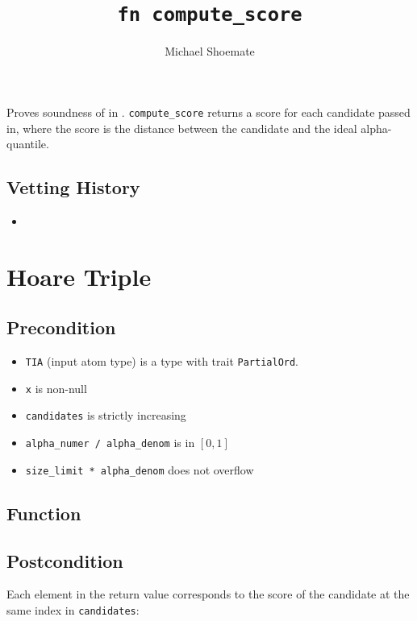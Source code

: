 \documentclass{article}
\title{\texttt{fn compute\_score}}
\author{Michael Shoemate}
\begin{document}
\maketitle  


\contrib

Proves soundness of  
in .
\texttt{compute\_score} returns a score for each candidate passed in, 
where the score is the distance between the candidate and the ideal alpha-quantile.

\subsection*{Vetting History}
\begin{itemize}
    \item {}
\end{itemize}

\section{Hoare Triple}
\subsection*{Precondition}
\begin{itemize}
    \item \texttt{TIA} (input atom type) is a type with trait \texttt{PartialOrd}.
    \item \texttt{x} is non-null
    \item \texttt{candidates} is strictly increasing
    \item \texttt{alpha\_numer / alpha\_denom} is in $[0, 1]$
    \item \texttt{size\_limit * alpha\_denom} does not overflow
\end{itemize}


\subsection*{Function}
\label{sec:python-pseudocode}



\subsection*{Postcondition}
Each element in the return value corresponds to the score of the candidate at the same index in \texttt{candidates}:
\end{document}
